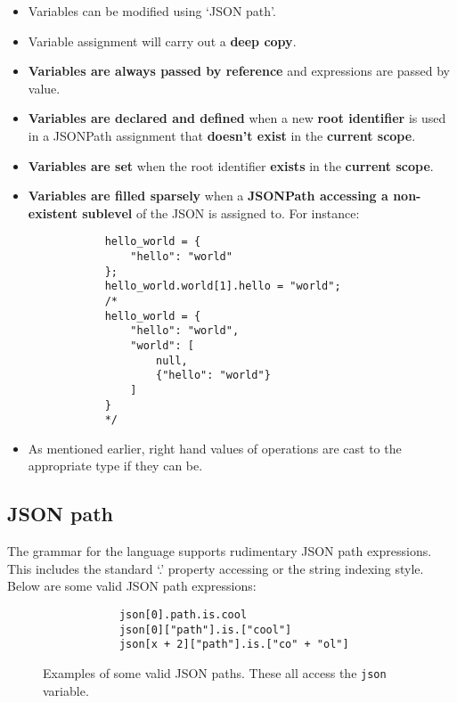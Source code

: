\begin{center}
    \begin{itemize}
        \item Variables can be modified using `JSON path'.
        \item Variable assignment will carry out a \textbf{deep copy}.
        \item \textbf{Variables are always passed by reference} and expressions are passed by value.
        \item \textbf{Variables are declared and defined} when a new \textbf{root identifier} is used in a JSONPath assignment that \textbf{doesn't exist} in the \textbf{current scope}.
        \item \textbf{Variables are set} when the root identifier \textbf{exists} in the \textbf{current scope}.
        \item \textbf{Variables are filled sparsely} when a \textbf{JSONPath accessing a non-existent sublevel} of the JSON is assigned to. For instance:
        \begin{verbatim}
            hello_world = {
                "hello": "world"
            };
            hello_world.world[1].hello = "world";
            /*
            hello_world = {
                "hello": "world",
                "world": [
                    null,
                    {"hello": "world"}
                ]
            }
            */
        \end{verbatim}
        \item As mentioned earlier, right hand values of operations are cast to the appropriate type if they can be. 
    \end{itemize}
\end{center}

\subsection{JSON path}

The grammar for the language supports rudimentary JSON path expressions. This includes the standard `.' property accessing or the string indexing style. Below are some valid JSON path expressions:

\begin{figure}[H]
    \begin{center}
        \begin{verbatim}
            json[0].path.is.cool
            json[0]["path"].is.["cool"]
            json[x + 2]["path"].is.["co" + "ol"]
        \end{verbatim}
    \end{center}
    \vspace{-1.5em}
    \cprotect\caption{Examples of some valid JSON paths. These all access the \verb|json| variable.}
\end{figure}

